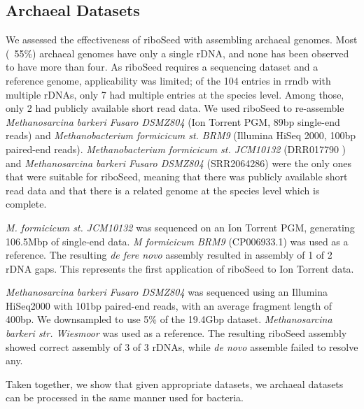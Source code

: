 \documentclass[10pt]{article}
\begin{document}
\subsection*{Archaeal Datasets}
We assessed the effectiveness of riboSeed with assembling archaeal genomes. Most (~55\%) archaeal genomes have only a single rDNA, and none has been observed to have more than four. As riboSeed requires a sequencing dataset and a reference genome, applicability was limited; of the 104 entries in rrndb with multiple rDNAs, only 7 had multiple entries at the species level. Among those, only 2 had publicly available short read data. We used riboSeed to re-assemble \textit{Methanosarcina barkeri Fusaro DSMZ804} (Ion Torrent PGM, 89bp single-end reads) and \textit{Methanobacterium formicicum st. BRM9} (Illumina HiSeq 2000, 100bp paired-end reads). \textit{Methanobacterium formicicum st. JCM10132} (DRR017790 ) and \textit{Methanosarcina barkeri Fusaro DSMZ804} (SRR2064286) were the only ones that were suitable for riboSeed, meaning that there was publicly available short read data and that there is a related genome at the species level which is complete.


\textit{M. formicicum st. JCM10132} was sequenced on an Ion Torrent PGM, generating 106.5Mbp of single-end data. \textit{M formicicum BRM9} (CP006933.1) was used as a reference. The resulting \textit{de fere novo} assembly resulted in assembly of 1 of 2 rDNA gaps. This represents the first application of riboSeed to Ion Torrent data.


\textit{Methanosarcina barkeri Fusaro DSMZ804} was sequenced using an Illumina HiSeq2000 with 101bp paired-end reads, with an average fragment length of 400bp. We downsampled to use 5\% of the 19.4Gbp dataset. \textit{Methanosarcina barkeri str. Wiesmoor} was used as a reference. The resulting riboSeed assembly showed correct assembly of 3 of 3 rDNAs, while \textit{de novo} assemble failed to resolve any.


Taken together, we show that given appropriate datasets, we archaeal datasets can be processed in the same manner used for bacteria.
\end{document}
